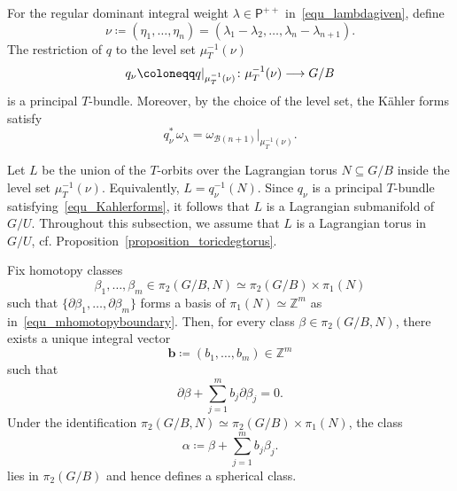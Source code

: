 \documentclass[11pt]{amsart}
\theoremstyle{plain}
\theoremstyle{definition}
\theoremstyle{remark}
\newcommand{\Z}{\mathbb{Z}}
\numberwithin{equation}{section} \numberwithin{table}{section}
\def\to{\mathchoice{\longrightarrow}{\rightarrow}{\rightarrow}{\rightarrow}}
\numberwithin{equation}{section}
\begin{document}
For the regular dominant integral weight $\lambda \in \mathsf{P}^{++}$ in~\eqref{equ_lambdagiven}, define
\begin{equation}\label{equ_choiceofnu}
\nu \coloneqq (\eta_1, \dots, \eta_n) = (\lambda_1-\lambda_2, \dots , \lambda_n-\lambda_{n+1}).
\end{equation}
The restriction of $q$ to the level set $\mu_T^{-1}(\nu)$
\begin{equation}\label{equ_quotientmapatlevelset}
q_\nu \coloneqq q|_{\mu_T^{-1}(\nu) } \colon \mu_T^{-1}(\nu) \to G/B
\end{equation}
is a principal $T$-bundle. Moreover, by the choice of the level set, the K\"{a}hler forms satisfy
\begin{equation}\label{equ_Kahlerforms}
q_\nu^* \, \omega_{\lambda} = \omega_{\mathcal{B}(n+1)}\big|_{\mu_T^{-1}(\nu)}.
\end{equation}

Let $L$ be the union of the $T$-orbits over the Lagrangian torus $N \subseteq G/B$ inside the level set $\mu_T^{-1}(\nu)$. Equivalently, $L = q_\nu^{-1}(N)$. Since $q_\nu$ is a principal $T$-bundle satisfying~\eqref{equ_Kahlerforms}, it follows that $L$ is a Lagrangian submanifold of $G/U$. Throughout this subsection, we assume that $L$ is a Lagrangian torus in $G/U$, cf. Proposition~\ref{proposition_toricdegtorus}.

Fix homotopy classes 
\begin{equation}\label{equ_beta1m}
\beta_1, \dots, \beta_m \in \pi_2(G/B, N) \simeq \pi_2(G/B) \times \pi_1(N)
\end{equation}
such that $\{\partial \beta_1, \dots, \partial \beta_m\}$ forms a basis of $\pi_1(N) \simeq \Z^m$ as in~\eqref{equ_mhomotopyboundary}. Then, for every class $\beta \in \pi_2(G/B,N)$, there exists a unique integral vector 
\begin{equation}\label{equ_mathbbbb}
\mathbf{b} \coloneqq (b_1, \dots, b_m) \in \Z^m
\end{equation}
such that
\begin{equation}\label{equ_boundaryfree2}
\partial \beta + \sum_{j=1}^m b_j \partial \beta_j = 0.
\end{equation}
Under the identification $\pi_2(G/B, N) \simeq \pi_2(G/B) \times \pi_1(N)$, the class
\begin{equation}\label{equ_sphericalalpha}
\alpha \coloneqq \beta + \sum_{j=1}^m b_j \beta_j.
\end{equation}
lies in $\pi_2(G/B)$ and hence defines a spherical class.
\end{document}
